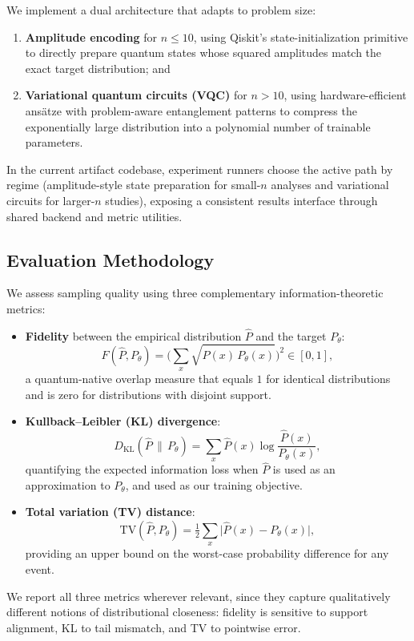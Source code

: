 \documentclass[conference,10pt]{IEEEtran}
\begin{document}
We implement a dual architecture that adapts to problem size:
\begin{enumerate}[leftmargin=*]
    \item \textbf{Amplitude encoding} for $n \le 10$, using Qiskit's state-initialization primitive to directly prepare quantum states whose squared amplitudes match the exact target distribution; and
    \item \textbf{Variational quantum circuits (VQC)} for $n > 10$, using hardware-efficient ans\"atze with problem-aware entanglement patterns to compress the exponentially large distribution into a polynomial number of trainable parameters.
\end{enumerate}
In the current artifact codebase, experiment runners choose the active path by regime (amplitude-style state preparation for small-$n$ analyses and variational circuits for larger-$n$ studies), exposing a consistent results interface through shared backend and metric utilities.

\subsection{Evaluation Methodology}

We assess sampling quality using three complementary information-theoretic metrics:
\begin{itemize}[leftmargin=*, topsep=0pt, partopsep=0pt, itemsep=2pt, parsep=0pt]
    \item \textbf{Fidelity} between the empirical distribution $\hat{P}$ and the target $P_\theta$:
    \[
    F(\hat{P}, P_\theta) = \Bigg(\sum_x \sqrt{\hat{P}(x)\,P_\theta(x)}\Bigg)^2 \in [0,1],
    \]
    a quantum-native overlap measure that equals $1$ for identical distributions and is zero for distributions with disjoint support.
    \item \textbf{Kullback--Leibler (KL) divergence}:
    \[
    D_{\mathrm{KL}}(\hat{P}\,\|\,P_\theta) = \sum_x \hat{P}(x)\log\frac{\hat{P}(x)}{P_\theta(x)},
    \]
    quantifying the expected information loss when $\hat{P}$ is used as an approximation to $P_\theta$, and used as our training objective.
    \item \textbf{Total variation (TV) distance}:
    \[
    \mathrm{TV}(\hat{P}, P_\theta) = \tfrac{1}{2}\sum_x \big|\hat{P}(x) - P_\theta(x)\big|,
    \]
    providing an upper bound on the worst-case probability difference for any event.
\end{itemize}
We report all three metrics wherever relevant, since they capture qualitatively different notions of distributional closeness: fidelity is sensitive to support alignment, KL to tail mismatch, and TV to pointwise error.
\end{document}
